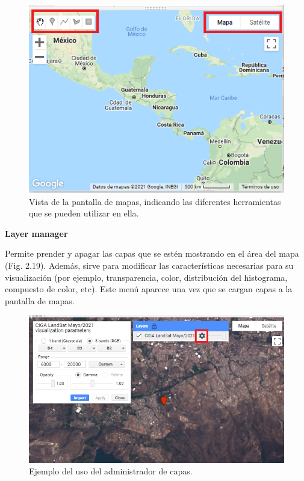 \documentclass[
  12pt,
  letterpaper,
  twoside]{book}
\begin{document}
\begin{figure}[btp]

{\centering \includegraphics[width=0.8\linewidth]{Img/drawing} 

}

\caption{Vista de la pantalla de mapas, indicando las diferentes herramientas que se pueden utilizar en ella.}\label{fig:unnamed-chunk-19}
\end{figure}

\textbf{Layer manager}

Permite prender y apagar las capas que se estén mostrando en el área del mapa (Fig. 2.19). Además, sirve para modificar las características necesarias para su visualización (por ejemplo, transparencia, color, distribución del histograma, compuesto de color, etc). Este menú aparece una vez que se cargan capas a la pantalla de mapas.

\begin{figure}[btp]

{\centering \includegraphics[width=0.8\linewidth]{Img/layer} 

}

\caption{Ejemplo del uso del administrador de capas.}\label{fig:unnamed-chunk-20}
\end{figure}
\end{document}
